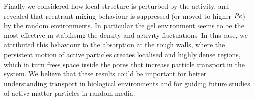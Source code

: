 Finally we considered how local structure is perturbed by the activity, and revealed that reentrant mixing behaviour is suppressed (or moved to higher $\operatorname{\mathit{P\kern-.08em e}}$) by the random environments. In particular the gel environment seems to be the most effective in stabilising the density and activity fluctuations. In this case, we attributed this behaviour to the absorption at the rough walls, where the persistent motion of active particles creates localised and highly dense regions, which in turn frees space inside the pores that increase particle transport in the system.
We believe that these results could be important for better understanding transport in biological environments and for guiding future studies of active matter particles in random media.



%
%
%
%
%
